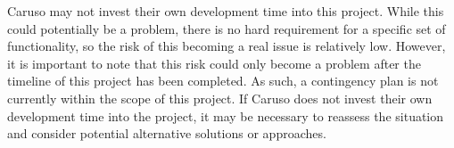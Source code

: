 Caruso may not invest their own development time into this project. While this could potentially be a problem, there is no hard requirement for a specific set of functionality, so the risk of this becoming a real issue is relatively low. However, it is important to note that this risk could only become a problem after the timeline of this project has been completed. As such, a contingency plan is not currently within the scope of this project. If Caruso does not invest their own development time into the project, it may be necessary to reassess the situation and consider potential alternative solutions or approaches.


